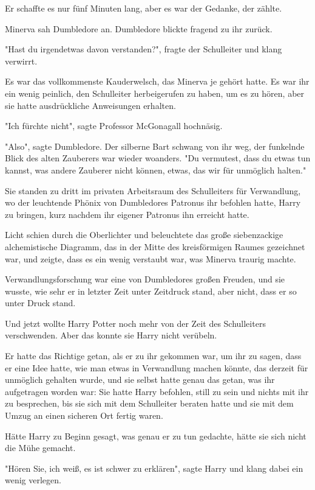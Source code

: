 {Er schaffte es nur fünf Minuten lang, aber es war der Gedanke, der zählte.

Minerva sah Dumbledore an. Dumbledore blickte fragend zu ihr zurück.

"Hast du irgendetwas davon verstanden?", fragte der Schulleiter und klang verwirrt.

Es war das vollkommenste Kauderwelsch, das Minerva je gehört hatte. Es war ihr ein wenig peinlich, den Schulleiter herbeigerufen zu haben, um es zu hören, aber sie hatte ausdrückliche Anweisungen erhalten.

"Ich fürchte nicht", sagte Professor McGonagall hochnäsig.

"Also", sagte Dumbledore. Der silberne Bart schwang von ihr weg, der funkelnde Blick des alten Zauberers war wieder woanders. "Du vermutest, dass du etwas tun kannst, was andere Zauberer nicht können, etwas, das wir für unmöglich halten."

Sie standen zu dritt im privaten Arbeitsraum des Schulleiters für Verwandlung, wo der leuchtende Phönix von Dumbledores Patronus ihr befohlen hatte, Harry zu bringen, kurz nachdem ihr eigener Patronus ihn erreicht hatte.

Licht schien durch die Oberlichter und beleuchtete das große siebenzackige alchemistische Diagramm, das in der Mitte des kreisförmigen Raumes gezeichnet war, und zeigte, dass es ein wenig verstaubt war, was Minerva traurig machte.

Verwandlungsforschung war eine von Dumbledores großen Freuden, und sie wusste, wie sehr er in letzter Zeit unter Zeitdruck stand, aber nicht, dass er so unter Druck stand.

Und jetzt wollte Harry Potter noch mehr von der Zeit des Schulleiters verschwenden. Aber das konnte sie Harry nicht verübeln.

Er hatte das Richtige getan, als er zu ihr gekommen war, um ihr zu sagen, dass er eine Idee hatte, wie man etwas in Verwandlung machen könnte, das derzeit für unmöglich gehalten wurde, und sie selbst hatte genau das getan, was ihr aufgetragen worden war: Sie hatte Harry befohlen, still zu sein und nichts mit ihr zu besprechen, bis sie sich mit dem Schulleiter beraten hatte und sie mit dem Umzug an einen sicheren Ort fertig waren.

Hätte Harry zu Beginn gesagt, was genau er zu tun gedachte, hätte sie sich nicht die Mühe gemacht.

"Hören Sie, ich weiß, es ist schwer zu erklären", sagte Harry und klang dabei ein wenig verlegen.

}
